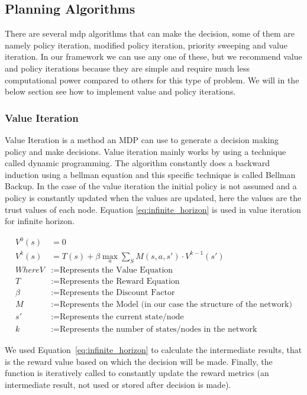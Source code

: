 \subsection{Planning Algorithms}
There are several \gls{mdp} algorithms that can make the decision, some of them are
namely policy iteration, modified policy iteration, priority sweeping and value
iteration.  In our framework we can use any one of these, but we recommend value
and policy iterations because they are simple and require much less
computational power compared to others for this type of problem. We will in the
below section see how to implement value and policy iterations.


\subsubsection{Value Iteration}
Value Iteration is a method an MDP can use to generate a decision making policy and make decisions. 
Value iteration mainly works by using a technique called dynamic
programming. The algorithm constantly does a backward induction using a bellman
equation \autocite{Wikipedia2013} and this specific technique is called Bellman Backup. In the case of the
value iteration the initial policy is not assumed and a policy is constantly
updated when the values are updated, here the values are the trust
values of each node.  Equation \ref{eq:infinite_horizon} is used in value iteration for infinite
horizon.

\begin{equation} 
    \label{eq:infinite_horizon}
    \begin{aligned}
    V^0(s) &= 0 \\
    V^k(s) &= T(s) + \beta \max_a \sum_S M(s,a,s') \cdot V^{k-1}(s') \\
    Where V &:= \text{Represents the Value Equation} \\
    T &:= \text{Represents the Reward Equation} \\
    \beta &:= \text{Represents the Discount Factor} \\
    M &:= \text{Represents the Model (in our case the structure of the network)} \\
    s' &:= \text{Represents the current state/node} \\
    k &:= \text{Represents the number of states/nodes in the network}
    \end{aligned}
\end{equation}


We used Equation~\ref{eq:infinite_horizon} to calculate the intermediate results, that is the
reward value based on which the decision will be made. Finally, the function is iteratively called to constantly update the reward
metrics (an intermediate result, not used or stored after decision is made).

